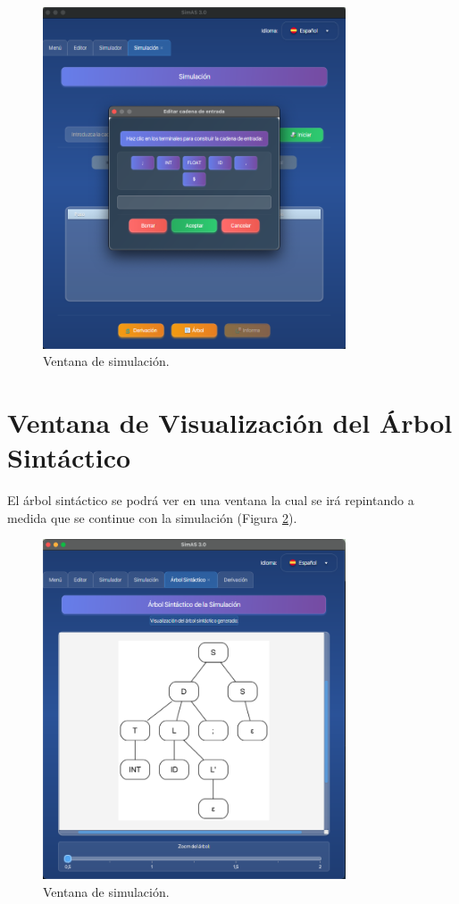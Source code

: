 \begin{figure}[htp]
\centering
	\includegraphics[width=0.8\textwidth]{figuras2/simulador/simulacion_cadenaEntrada.png}
	\caption{Ventana de simulación.}
	\label{fig:d7}
\end{figure}

\section{Ventana de Visualización del Árbol Sintáctico}

El árbol sintáctico se podrá ver en una ventana la cual se irá repintando a medida que se continue con la simulación (Figura \ref{fig:da22}).

\begin{figure}[htp]
\centering
	\includegraphics[width=0.8\textwidth]{figuras2/simulador/simulacion_arbol.png}
	\caption{Ventana de simulación.}
	\label{fig:da22}
\end{figure}

